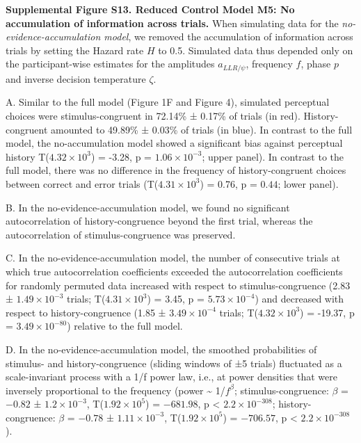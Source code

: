 \documentclass[
]{article}
\begin{document}
\textbf{Supplemental Figure S13. Reduced Control Model M5: No
accumulation of information across trials.} When simulating data for the
\emph{no-evidence-accumulation model}, we removed the accumulation of
information across trials by setting the Hazard rate \(H\) to 0.5.
Simulated data thus depended only on the participant-wise estimates for
the amplitudes \(a_{LLR/\psi}\), frequency \(f\), phase \(p\) and
inverse decision temperature \(\zeta\).

A. Similar to the full model (Figure 1F and Figure 4), simulated
perceptual choices were stimulus-congruent in 72.14\% ± 0.17\% of trials
(in red). History-congruent amounted to 49.89\% ± 0.03\% of trials (in
blue). In contrast to the full model, the no-accumulation model showed a
significant bias against perceptual history
T(\ensuremath{4.32\times 10^{3}}) = -3.28, p =
\(\ensuremath{1.06\times 10^{-3}}\); upper panel). In contrast to the
full model, there was no difference in the frequency of
history-congruent choices between correct and error trials
(T(\ensuremath{4.31\times 10^{3}}) = 0.76, p = \(0.44\); lower panel).

B. In the no-evidence-accumulation model, we found no significant
autocorrelation of history-congruence beyond the first trial, whereas
the autocorrelation of stimulus-congruence was preserved.

C. In the no-evidence-accumulation model, the number of consecutive
trials at which true autocorrelation coefficients exceeded the
autocorrelation coefficients for randomly permuted data increased with
respect to stimulus-congruence (2.83 ± \ensuremath{1.49\times 10^{-3}}
trials; T(\ensuremath{4.31\times 10^{3}}) = 3.45, p =
\(\ensuremath{5.73\times 10^{-4}}\)) and decreased with respect to
history-congruence (1.85 ± \ensuremath{3.49\times 10^{-4}} trials;
T(\ensuremath{4.32\times 10^{3}}) = -19.37, p =
\(\ensuremath{3.49\times 10^{-80}}\)) relative to the full model.

D. In the no-evidence-accumulation model, the smoothed probabilities of
stimulus- and history-congruence (sliding windows of ±5 trials)
fluctuated as a scale-invariant process with a 1/f power law, i.e., at
power densities that were inversely proportional to the frequency (power
\textasciitilde{} 1/\(f^\beta\); stimulus-congruence: \(\beta\) =
\(-0.82\) ± \(\ensuremath{1.2\times 10^{-3}}\),
T(\(\ensuremath{1.92\times 10^{5}}\)) = \(-681.98\), p < \(\ensuremath{2.2\times 10^{-308}}\);
history-congruence: \(\beta\) = \(-0.78\) ±
\(\ensuremath{1.11\times 10^{-3}}\),
T(\(\ensuremath{1.92\times 10^{5}}\)) = \(-706.57\), p < \(\ensuremath{2.2\times 10^{-308}}\)).
\end{document}

